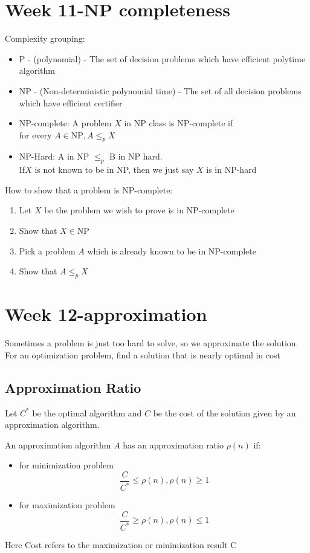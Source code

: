 \documentclass{article}
\begin{document}
\begin{multicols*}{4}
\section{Week 11-NP completeness}
Complexity grouping:
\begin{itemize}
	\item P - (polynomial) - The set of decision problems which have efficient polytime algorithm
	\item NP - (Non-deterministic polynomial time) - The set of all decision problems which have efficient certifier
	\item NP-complete: A problem $X$ in NP class is NP-complete if\\for every $A\in \text{NP}, A\leq_pX$
	\item NP-Hard: A in NP $\leq_p$ B in NP hard.\\ If$X$ is not known to be in NP, then we just say $X$ is in NP-hard
\end{itemize}

How to show that a problem is NP-complete:
\begin{enumerate}
	\item Let $X$ be the problem we wish to prove is in NP-complete
	\item Show that $X\in \text{NP}$
	\item Pick a problem $A$ which is already known to be in NP-complete
	\item Show that $A\leq_pX$
\end{enumerate}
\section{Week 12-approximation}
Sometimes a problem is just too hard to solve, so we approximate the solution.\\
For an optimization problem, find a solution that is nearly optimal in cost

\subsection{Approximation Ratio}
Let $C^*$ be the optimal algorithm and $C$ be the cost of the solution given by an approximation algorithm.

An approximation algorithm $A$ has an approximation ratio $\rho(n)$ if:
\begin{itemize}
	\item for minimization problem $$\frac{C}{C^*}\leq \rho(n),\rho(n) \geq 1$$
	\item for maximization problem $$\frac{C}{C^*}\geq \rho(n),\rho(n) \leq 1$$
\end{itemize}
Here Cost refers to the maximization or minimization result C


\end{multicols*}
\end{document}
